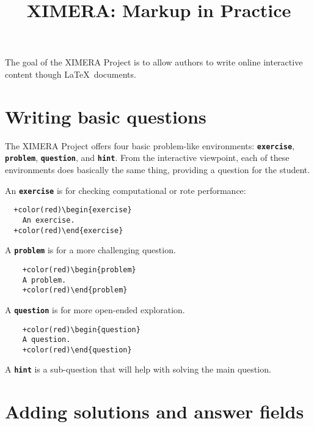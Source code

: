 \documentclass{amsart}
\newcommand\code[1]{{\bfseries\texttt{#1}}}
\begin{document}
\title{XIMERA: Markup in Practice}
\maketitle

\tableofcontents

The goal of the XIMERA Project is to allow authors to write online
interactive content though \LaTeX\ documents.


\section{Writing basic questions}


The XIMERA Project offers four basic problem-like environments:
\code{exercise}, \code{problem}, \code{question}, and
\code{hint}. From the interactive viewpoint, each of these
environments does basically the same thing, providing a question for
the student.

An \code{exercise} is for checking computational or rote performance:

\begin{Verbatim}
  +color(red)\begin{exercise}
    An exercise.
  +color(red)\end{exercise}
\end{Verbatim}

A \code{problem} is for a more challenging question.

\begin{Verbatim}
    +color(red)\begin{problem}
    A problem.
    +color(red)\end{problem}
\end{Verbatim}

A \code{question} is for more open-ended exploration. 

\begin{Verbatim}
    +color(red)\begin{question}
    A question.
    +color(red)\end{question}
\end{Verbatim}

A \code{hint} is a sub-question that will help with solving the main
question.



\section{Adding solutions and answer fields}
\end{document}
